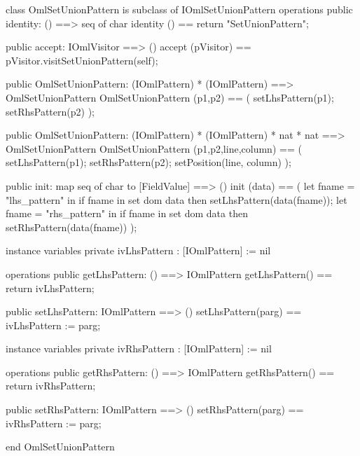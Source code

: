\begin{vdm_al}
class OmlSetUnionPattern is subclass of IOmlSetUnionPattern
operations
  public identity: () ==> seq of char
  identity () == return "SetUnionPattern";

  public accept: IOmlVisitor ==> ()
  accept (pVisitor) == pVisitor.visitSetUnionPattern(self);

  public OmlSetUnionPattern:
    (IOmlPattern) *
    (IOmlPattern) ==> OmlSetUnionPattern
  OmlSetUnionPattern (p1,p2) == 
    ( setLhsPattern(p1);
      setRhsPattern(p2) );

  public OmlSetUnionPattern:
    (IOmlPattern) *
    (IOmlPattern) *
    nat *
    nat ==> OmlSetUnionPattern
  OmlSetUnionPattern (p1,p2,line,column) == 
    ( setLhsPattern(p1);
      setRhsPattern(p2);
      setPosition(line, column) );

  public init: map seq of char to [FieldValue] ==> ()
  init (data) ==
    ( let fname = "lhs_pattern" in
        if fname in set dom data
        then setLhsPattern(data(fname));
      let fname = "rhs_pattern" in
        if fname in set dom data
        then setRhsPattern(data(fname)) );

instance variables
  private ivLhsPattern : [IOmlPattern] := nil

operations
  public getLhsPattern: () ==> IOmlPattern
  getLhsPattern() == return ivLhsPattern;

  public setLhsPattern: IOmlPattern ==> ()
  setLhsPattern(parg) == ivLhsPattern := parg;

instance variables
  private ivRhsPattern : [IOmlPattern] := nil

operations
  public getRhsPattern: () ==> IOmlPattern
  getRhsPattern() == return ivRhsPattern;

  public setRhsPattern: IOmlPattern ==> ()
  setRhsPattern(parg) == ivRhsPattern := parg;

end OmlSetUnionPattern
\end{vdm_al}

